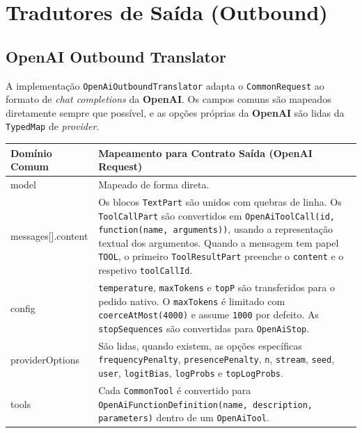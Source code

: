     \section{Tradutores de Saída (Outbound)}
    \subsection{\textbf{OpenAI} Outbound Translator}

    A implementação \texttt{OpenAiOutboundTranslator} adapta o \texttt{CommonRequest} ao formato de \textit{chat completions} da \textbf{OpenAI}. Os campos comuns são mapeados diretamente sempre que possível, e as opções próprias da \textbf{OpenAI} são lidas da \texttt{TypedMap} de \textit{provider}.

    \begin{table}[H]
        \centering
        \footnotesize
        \renewcommand{\arraystretch}{1.25}
        \begin{tabularx}{\textwidth}{|>{\ttfamily\raggedright\arraybackslash}p{4cm}|Y|}
            \hline
            \textbf{Domínio Comum} & \textbf{Mapeamento para Contrato Saída (OpenAI Request)} \\
            \hline
            model & Mapeado de forma direta. \\
            \hline
            messages[].content & Os blocos \texttt{TextPart} são unidos com quebras de linha. Os \texttt{ToolCallPart} são convertidos em \texttt{OpenAiToolCall(id, function(name, arguments))}, usando a representação textual dos argumentos. Quando a mensagem tem papel \texttt{TOOL}, o primeiro \texttt{ToolResultPart} preenche o \texttt{content} e o respetivo \texttt{toolCallId}. \\
            \hline
            config & \texttt{temperature}, \texttt{maxTokens} e \texttt{topP} são transferidos para o pedido nativo. O \texttt{maxTokens} é limitado com \texttt{coerceAtMost(4000)} e assume \texttt{1000} por defeito. As \texttt{stopSequences} são convertidas para \texttt{OpenAiStop}. \\
            \hline
            providerOptions & São lidas, quando existem, as opções específicas \texttt{frequencyPenalty}, \texttt{presencePenalty}, \texttt{n}, \texttt{stream}, \texttt{seed}, \texttt{user}, \texttt{logitBias}, \texttt{logProbs} e \texttt{topLogProbs}. \\
            \hline
            tools & Cada \texttt{CommonTool} é convertido para \texttt{OpenAiFunctionDefinition(name, description, parameters)} dentro de um \texttt{OpenAiTool}. \\

\end{tabularx}
\end{table}
